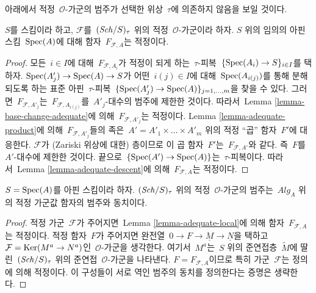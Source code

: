 \noindent
아래에서 적정\  $\mathcal{O}$-가군의 범주가 선택한 위상\  $\tau$에
의존하지 않음을 보일 것이다.

\begin{lemma}
\label{lemma-adequate-local}
$S$를 스킴이라 하고, $\mathcal{F}$를\  $(\mathit{Sch}/S)_\tau$ 위의 적정\ 
$\mathcal{O}$-가군이라 하자. $S$ 위의 임의의 아핀 스킴\ 
$\mathop{\mathrm{Spec}}(A)$에 대해 함자\  $F_{\mathcal{F}, A}$는 적정이다.
\end{lemma}

\begin{proof}
모든\  $i \in I$에 대해\  $F_{\mathcal{F}, A_i}$가 적정이 되게 하는\ 
$\tau$-피복\  $\{\mathop{\mathrm{Spec}}(A_i) \to S\}_{i \in I}$를 택하자.
$\mathop{\mathrm{Spec}}(A'_j) \to \mathop{\mathrm{Spec}}(A) \to S$가 어떤\  $i(j) \in I$에 대해\ 
$\mathop{\mathrm{Spec}}(A_{i(j)})$를 통해 분해되도록 하는 표준 아핀\  $\tau$-피복\ 
$\{\mathop{\mathrm{Spec}}(A'_j) \to \mathop{\mathrm{Spec}}(A)\}_{j = 1, \ldots, m}$을 찾을 수 있다.
그러면\  $F_{\mathcal{F}, A'_j}$는\  $F_{\mathcal{F}, A_{i(j)}}$를\ 
$A'_j$-대수의 범주에 제한한 것이다. 따라서\  Lemma
\ref{lemma-base-change-adequate}에 의해\  $F_{\mathcal{F}, A'_j}$는
적정이다. Lemma \ref{lemma-adequate-product}에 의해\ 
$F_{\mathcal{F}, A'_j}$들의 족은\ 
$A' = A'_1 \times \ldots \times A'_m$ 위의 적정 ``곱'' 함자\ 
$F'$에 대응한다. $\mathcal{F}$가 (Zariski 위상에 대한) 층이므로
이 곱 함자\  $F'$는\  $F_{\mathcal{F}, A'}$와 같다. 즉\  $F$를\ 
$A'$-대수에 제한한 것이다. 끝으로\ 
$\{\mathop{\mathrm{Spec}}(A') \to \mathop{\mathrm{Spec}}(A)\}$는\  $\tau$-피복이다. 따라서\  Lemma
\ref{lemma-adequate-descent}에 의해\  $F_{\mathcal{F}, A}$는 적정이다.
\end{proof}

\begin{lemma}
\label{lemma-adequate-affine}
$S = \mathop{\mathrm{Spec}}(A)$를 아핀 스킴이라 하자. $(\mathit{Sch}/S)_\tau$ 위의 적정\ 
$\mathcal{O}$-가군의 범주는\  $\textit{Alg}_A$ 위의 적정 가군값
함자의 범주와 동치이다.
\end{lemma}

\begin{proof}
적정 가군\  $\mathcal{F}$가 주어지면\  Lemma
\ref{lemma-adequate-local}에 의해 함자\  $F_{\mathcal{F}, A}$는 적정이다.
적정 함자\  $F$가 주어지면 완전열\ 
$0 \to F \to \underline{M} \to \underline{N}$을 택하고\ 
$\mathcal{F} = \mathop{\mathrm{Ker}}(M^a \to N^a)$인\  $\mathcal{O}$-가군을 생각한다.
여기서\  $M^a$는\  $S$ 위의 준연접층\  $\widetilde{M}$에 딸린\ 
$(\mathit{Sch}/S)_\tau$ 위의 준연접\  $\mathcal{O}$-가군을 나타낸다.
$F = F_{\mathcal{F}, A}$이므로 특히 가군\  $\mathcal{F}$는 정의에
의해 적정이다. 이 구성들이 서로 역인 범주의 동치를 정의한다는
증명은 생략한다.
\end{proof}

